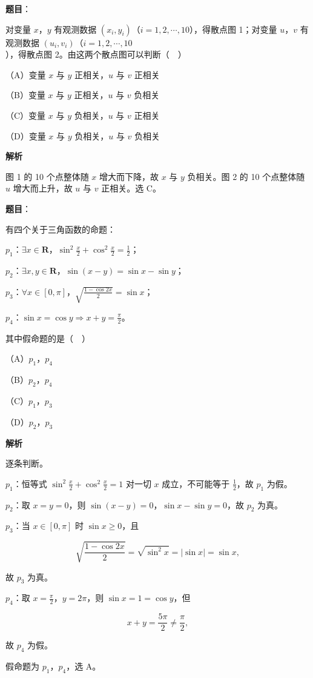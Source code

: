 \begin{answer}

\textbf{题目}：

对变量 $x$，$y$ 有观测数据 $(x_i,y_i)$（$i=1,2,\cdots,10$），得散点图 1；对变量 $u$，$v$ 有观测数据 $(u_i,v_i)$（$i=1,2,\cdots,10$），得散点图 2。由这两个散点图可以判断（　）
\nopagebreak[4]
\begin{center}\end{center}
\nopagebreak[4]
（A）变量 $x$ 与 $y$ 正相关，$u$ 与 $v$ 正相关

（B）变量 $x$ 与 $y$ 正相关，$u$ 与 $v$ 负相关

（C）变量 $x$ 与 $y$ 负相关，$u$ 与 $v$ 正相关

（D）变量 $x$ 与 $y$ 负相关，$u$ 与 $v$ 负相关

\textbf{解析}

图 1 的 10 个点整体随 $x$ 增大而下降，故 $x$ 与 $y$ 负相关。图 2 的 10 个点整体随 $u$ 增大而上升，故 $u$ 与 $v$ 正相关。选 C。


\end{answer}
\begin{answer}

\textbf{题目}：

有四个关于三角函数的命题：

$p_1$：$\exists x\in\mathbf R$，$\sin^2\frac x2+\cos^2\frac x2=\frac12$；

$p_2$：$\exists x,y\in\mathbf R$，$\sin(x-y)=\sin x-\sin y$；

$p_3$：$\forall x\in[0,\pi]$，$\sqrt{\frac{1-\cos2x}{2}}=\sin x$；

$p_4$：$\sin x=\cos y\Rightarrow x+y=\frac{\pi}{2}$。

其中假命题的是（　）

（A）$p_1$，$p_4$

（B）$p_2$，$p_4$

（C）$p_1$，$p_3$

（D）$p_2$，$p_3$

\textbf{解析}

逐条判断。

$p_1$：恒等式 $\sin^2\frac x2+\cos^2\frac x2=1$ 对一切 $x$ 成立，不可能等于 $\frac12$，故 $p_1$ 为假。

$p_2$：取 $x=y=0$，则 $\sin(x-y)=0$，$\sin x-\sin y=0$，故 $p_2$ 为真。

$p_3$：当 $x\in[0,\pi]$ 时 $\sin x\geqslant0$，且

\nopagebreak[4]
\[\sqrt{\frac{1-\cos2x}{2}}=\sqrt{\sin^2x}=|\sin x|=\sin x,\]

故 $p_3$ 为真。

$p_4$：取 $x=\frac{\pi}{2}$，$y=2\pi$，则 $\sin x=1=\cos y$，但

\nopagebreak[4]
\[x+y=\frac{5\pi}{2}\neq\frac{\pi}{2},\]

故 $p_4$ 为假。

假命题为 $p_1$，$p_4$，选 A。


\end{answer}
